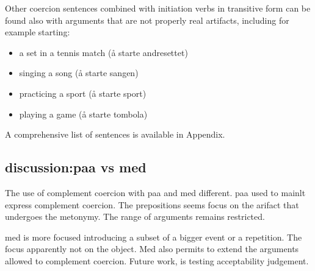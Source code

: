 \documentclass{article}
\begin{document}
Other coercion sentences combined with initiation verbs in transitive form can be found also with arguments that are not properly real artifacts, including for example starting:
\begin{itemize}
    \item  a set in a tennis match (å starte andresettet) 
    \item  singing a song (å starte sangen)
    \item  practicing a sport (å starte sport)
    \item  playing a game (å starte tombola)
\end{itemize}
A comprehensive list of sentences is available in Appendix. 

% 
 
 \subsection{discussion:paa vs med}
 The use of complement coercion with paa and med different. 
 paa used to mainlt express complement coercion. The prepositions seems focus on the arifact that undergoes the metonymy. The range of arguments remains restricted.    

med is more focused introducing a subset of a bigger event or a repetition. The focus apparently not on the object. Med also permits to extend the arguments allowed to complement coercion. Future work, is testing acceptability judgement.  
\end{document}
